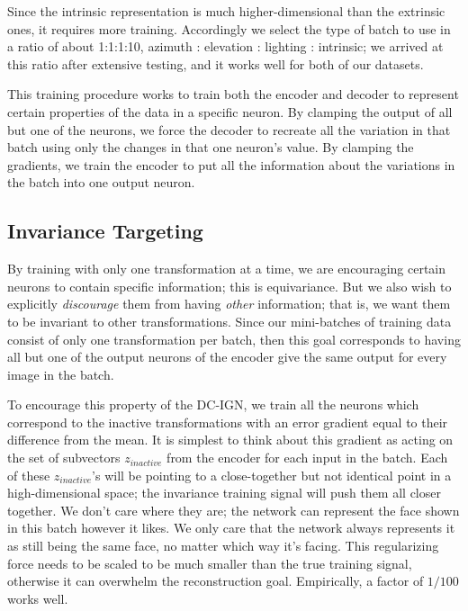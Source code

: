 \documentclass[12pt,twoside]{mitthesis}
\begin{document}
Since the intrinsic representation is much higher-dimensional than the
extrinsic ones, it requires more training. Accordingly we select the
type of batch to use in a ratio of about 1:1:1:10, azimuth : elevation :
lighting : intrinsic; we arrived at this ratio after extensive testing,
and it works well for both of our datasets.

This training procedure works to train both the encoder and decoder to
represent certain properties of the data in a specific neuron. By
clamping the output of all but one of the neurons, we force the decoder
to recreate all the variation in that batch using only the changes in
that one neuron's value. By clamping the gradients, we train the encoder
to put all the information about the variations in the batch into one
output neuron.

\subsection{Invariance Targeting}\label{sec:targetedinvar}

By training with only one transformation at a time, we are encouraging
certain neurons to contain specific information; this is equivariance.
But we also wish to explicitly \emph{discourage} them from having
\emph{other} information; that is, we want them to be invariant to other
transformations. Since our mini-batches of training data consist of only
one transformation per batch, then this goal corresponds to having all
but one of the output neurons of the encoder give the same output for
every image in the batch.

To encourage this property of the DC-IGN, we train all the neurons which
correspond to the inactive transformations with an error gradient equal
to their difference from the mean. It is simplest to think about this
gradient as acting on the set of subvectors $z_{inactive}$ from the
encoder for each input in the batch. Each of these $z_{inactive}$'s
will be pointing to a close-together but not identical point in a
high-dimensional space; the invariance training signal will push them
all closer together. We don't care where they are; the network can
represent the face shown in this batch however it likes. We only care
that the network always represents it as still being the same face, no
matter which way it's facing. This regularizing force needs to be scaled
to be much smaller than the true training signal, otherwise it can
overwhelm the reconstruction goal. Empirically, a factor of $1/100$
works well.
\end{document}
